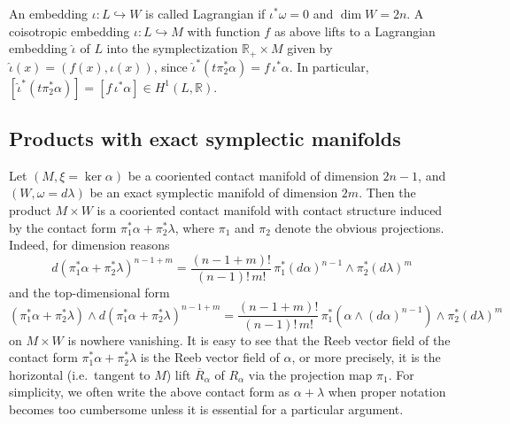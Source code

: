 \documentclass{amsart}
\theoremstyle{remark}
\def\R{{\mathbb R}}
\begin{document}
An embedding $\iota \colon L \hookrightarrow W$ is called Lagrangian if $\iota^* \omega = 0$ and $\dim W = 2 n$.
A coisotropic embedding $\iota \colon L \hookrightarrow M$ with function $f$ as above lifts to a Lagrangian embedding $\hat{\iota}$ of $L$ into the symplectization $\R_+ \times M$ given by $\hat{\iota} (x) = (f (x), \iota (x))$, since $\hat{\iota}^* (t \pi_2^* \alpha) = f \, \iota^* \alpha$.
In particular, $[\hat{\iota}^* (t \pi_2^* \alpha)] = [f \, \iota^* \alpha] \in H^1 (L, \R)$.

\subsection{Products with exact symplectic manifolds}
Let $(M, \xi = \ker \alpha)$ be a cooriented contact manifold of dimension $2 n - 1$, and $(W, \omega = d\lambda)$ be an exact symplectic manifold of dimension $2 m$.
Then the product $M \times W$ is a cooriented contact manifold with contact structure induced by the contact form $\pi_1^* \alpha + \pi_2^* \lambda$, where $\pi_1$ and $\pi_2$ denote the obvious projections.
Indeed, for dimension reasons
\[ d (\pi_1^* \alpha + \pi_2^* \lambda)^{n - 1 + m} = \frac{(n - 1 + m)!}{(n - 1)! \, m!} \, \pi_1^* (d\alpha)^{n - 1} \wedge \pi_2^* (d\lambda)^m \]
and the top-dimensional form
\[ (\pi_1^* \alpha + \pi_2^* \lambda) \wedge d (\pi_1^* \alpha + \pi_2^* \lambda)^{n - 1 + m} = \frac{(n - 1 + m)!}{(n - 1)! \, m!} \, \pi_1^* (\alpha \wedge (d\alpha)^{n - 1}) \wedge \pi_2^* (d\lambda)^m \]
on $M \times W$ is nowhere vanishing.
It is easy to see that the Reeb vector field of the contact form $\pi_1^* \alpha + \pi_2^* \lambda$ is the Reeb vector field of $\alpha$, or more precisely, it is the horizontal (i.e.\ tangent to $M$) lift $\overline{R}_\alpha$ of $R_\alpha$ via the projection map $\pi_1$.
For simplicity, we often write the above contact form as $\alpha + \lambda$ when proper notation becomes too cumbersome unless it is essential for a particular argument.
\end{document}

